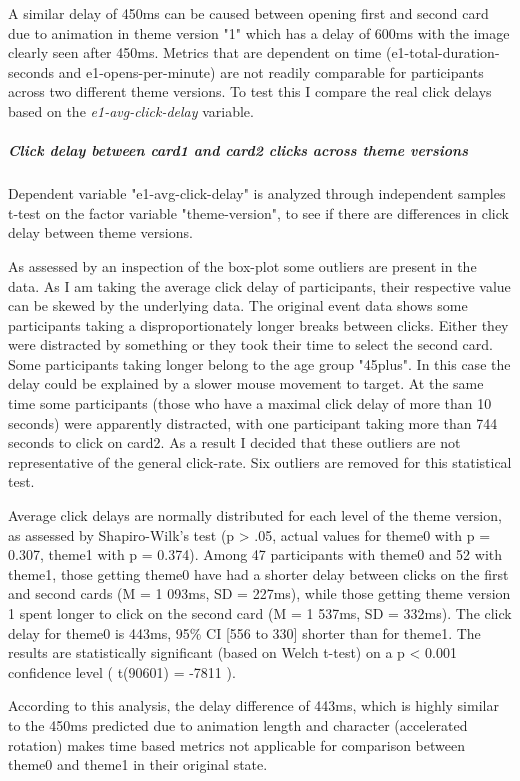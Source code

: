 	A similar delay of 450ms can be caused between opening first and second card due to animation in theme version "1" which has a delay of 600ms with the image clearly seen after 450ms. Metrics that are dependent on time (e1-total-duration-seconds and e1-opens-per-minute) are not readily comparable for participants across two different theme versions. To test this I compare the real click delays based on the \textit{e1-avg-click-delay} variable.

	\subparagraph{Click delay between card1 and card2 clicks across theme versions} Dependent variable "e1-avg-click-delay" is analyzed through independent samples t-test on the factor variable "theme-version", to see if there are differences in click delay between theme versions.
	
	As assessed by an inspection of the box-plot some outliers are present in the data. As I am taking the average click delay of participants, their respective value can be skewed by the underlying data. The original event data shows some participants taking a disproportionately longer breaks between clicks. Either they were distracted by something or they took their time to select the second card. Some participants taking longer belong to the age group "45plus". In this case the delay could be explained by a slower mouse movement to target. At the same time some participants (those who have a maximal click delay of more than 10 seconds) were apparently distracted, with one participant taking more than 744 seconds to click on card2. As a result I decided that these outliers are not representative of the general click-rate. Six outliers are removed for this statistical test.
	
	Average click delays are normally distributed for each level of the theme version, as assessed by Shapiro-Wilk's test (p > .05, actual values for theme0 with p = 0.307, theme1 with p = 0.374). Among 47 participants with theme0 and 52 with theme1, those getting theme0 have had a shorter delay between clicks on the first and second cards (M = 1 093ms, SD = 227ms), while those getting theme version 1 spent longer to click on the second card (M = 1 537ms, SD = 332ms). The click delay for theme0 is 443ms, 95\% CI [556 to 330] shorter than for theme1. The results are statistically significant (based on Welch t-test) on a p < 0.001 confidence level ( t(90601) = -7811 ).
	
	According to this analysis, the delay difference of 443ms, which is highly similar to the 450ms predicted due to animation length and character (accelerated rotation) makes time based metrics not applicable for comparison between theme0 and theme1 in their original state.
	
